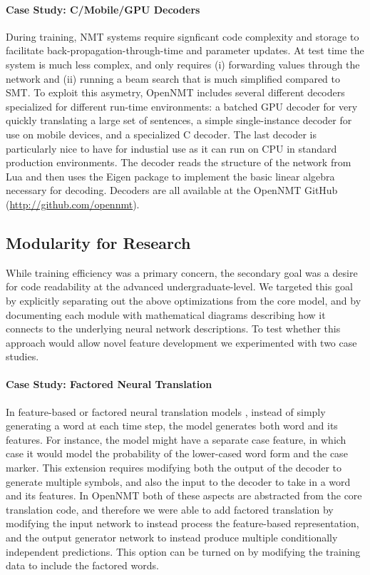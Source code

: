 \documentclass[11pt]{article}
\begin{document}
\paragraph{Case Study: C/Mobile/GPU Decoders} During training, NMT
systems require signficant code complexity and storage to facilitate
back-propagation-through-time and parameter updates. At test time the
system is much less complex, and only requires (i) forwarding values
through the network and (ii) running a beam search that is much
simplified compared to SMT. To exploit this asymetry, OpenNMT includes
several different decoders specialized for different run-time
environments: a batched GPU decoder for very quickly translating a
large set of sentences, a simple single-instance decoder for use on
mobile devices, and a specialized C decoder. The last decoder is
particularly nice to have for industial use as it can run on CPU in standard
production environments. The decoder reads the structure of the
network from Lua and then uses the Eigen package to implement the
basic linear algebra necessary for decoding. Decoders are all 
available at the OpenNMT GitHub (\url{http://github.com/opennmt}).


\subsection{Modularity for Research}

While training efficiency was a primary concern, the secondary goal
was a desire for code readability at the 
advanced undergraduate-level.  We targeted this goal by explicitly
separating out the above optimizations from the core model, and by 
documenting each module with mathematical diagrams describing how 
it connects to the underlying neural network descriptions. To test whether 
this approach would allow novel feature development we experimented with 
two case studies.

\paragraph{Case Study: Factored Neural Translation}

In feature-based or factored neural translation models
\cite{sennrich2016linguistic}, instead of simply generating a word at
each time step, the model generates both word and its features. For
instance, the model might have a separate case feature, in which case
it would model the probability of the lower-cased word form and the
case marker. This extension requires modifying both the output of the
decoder to generate multiple symbols, and also the input to the
decoder to take in a word and its features. In OpenNMT both of these
aspects are abstracted from the core translation code, and therefore
we were able to add factored translation by modifying the input
network to instead process the feature-based representation, and the
output generator network to instead produce multiple conditionally
independent predictions.  This option can be turned on by modifying
the training data to include the factored words.
\end{document}
